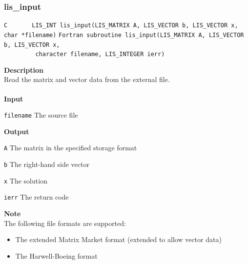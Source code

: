\documentclass[a4paper]{article}
\newcommand{\namelistlabel}[1]{\mbox{#1}\hfill}
\newenvironment{namelist}[1]{%
\begin{list}{}
  {\let\makelabel\namelistlabel
  \settowidth{\labelwidth}{#1}
  \setlength{\leftmargin}{1.1\labelwidth}}
  }{%
\end{list}}
\begin{document}
\subsubsection{lis\_input}
\begin{screen}
\verb|C       LIS_INT lis_input(LIS_MATRIX A, LIS_VECTOR b, LIS_VECTOR x, char *filename)|
\verb|Fortran subroutine lis_input(LIS_MATRIX A, LIS_VECTOR b, LIS_VECTOR x,|\\
\verb|         character filename, LIS_INTEGER ierr)|
\end{screen}
{\bf Description}\\
\indent
Read the matrix and vector data from the external file. 
\\ \\
\noindent
{\bf Input}
\begin{namelist}{XXXXXXXXXXXXXXXXXXXX}
\item[\tt filename] The source file
\end{namelist}
{\bf Output}
\begin{namelist}{XXXXXXXXXXXXXXXXXXXX}
\item[\tt A] The matrix in the specified storage format
\item[\tt b] The right-hand side vector
\item[\tt x] The solution
\item[\tt ierr] The return code
\end{namelist}
{\bf Note}\\
\indent
The following file formats are supported:
\begin{itemize}
\item The extended Matrix Market format (extended to allow vector data)
\item The Harwell-Boeing format
\end{itemize}
\end{document}

